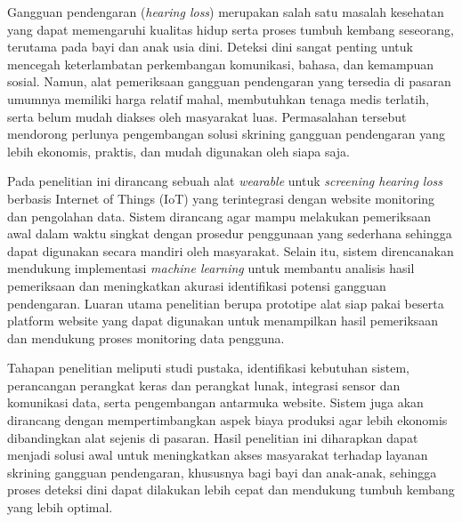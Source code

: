Gangguan pendengaran (\textit{hearing loss}) merupakan salah satu masalah kesehatan yang dapat memengaruhi kualitas hidup serta proses tumbuh kembang seseorang, terutama pada bayi dan anak usia dini. Deteksi dini sangat penting untuk mencegah keterlambatan perkembangan komunikasi, bahasa, dan kemampuan sosial. Namun, alat pemeriksaan gangguan pendengaran yang tersedia di pasaran umumnya memiliki harga relatif mahal, membutuhkan tenaga medis terlatih, serta belum mudah diakses oleh masyarakat luas. Permasalahan tersebut mendorong perlunya pengembangan solusi skrining gangguan pendengaran yang lebih ekonomis, praktis, dan mudah digunakan oleh siapa saja.

Pada penelitian ini dirancang sebuah alat \textit{wearable} untuk \textit{screening hearing loss} berbasis Internet of Things (IoT) yang terintegrasi dengan website monitoring dan pengolahan data. Sistem dirancang agar mampu melakukan pemeriksaan awal dalam waktu singkat dengan prosedur penggunaan yang sederhana sehingga dapat digunakan secara mandiri oleh masyarakat. Selain itu, sistem direncanakan mendukung implementasi \textit{machine learning} untuk membantu analisis hasil pemeriksaan dan meningkatkan akurasi identifikasi potensi gangguan pendengaran. Luaran utama penelitian berupa prototipe alat siap pakai beserta platform website yang dapat digunakan untuk menampilkan hasil pemeriksaan dan mendukung proses monitoring data pengguna.

Tahapan penelitian meliputi studi pustaka, identifikasi kebutuhan sistem, perancangan perangkat keras dan perangkat lunak, integrasi sensor dan komunikasi data, serta pengembangan antarmuka website. Sistem juga akan dirancang dengan mempertimbangkan aspek biaya produksi agar lebih ekonomis dibandingkan alat sejenis di pasaran. Hasil penelitian ini diharapkan dapat menjadi solusi awal untuk meningkatkan akses masyarakat terhadap layanan skrining gangguan pendengaran, khususnya bagi bayi dan anak-anak, sehingga proses deteksi dini dapat dilakukan lebih cepat dan mendukung tumbuh kembang yang lebih optimal.
